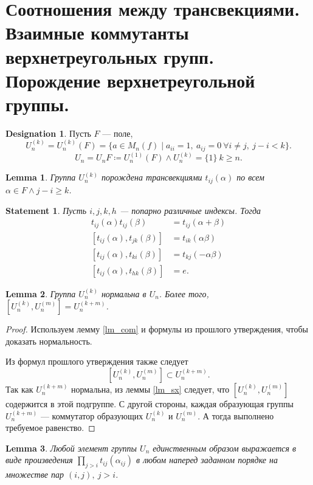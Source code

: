 \documentclass[11pt]{book}
\renewcommand{\ge}{\geqslant}
\theoremstyle{definition}
\theoremstyle{plain}
\theoremstyle{plain}
\newtheorem{lm}{Lemma}
\newtheorem{st}{Statement}
\theoremstyle{definition}
\newtheorem*{name}{Designation}
\theoremstyle{remark}
\begin{document}
\section{Соотношения между трансвекциями. Взаимные коммутанты верхнетреугольных групп. Порождение верхнетреугольной группы.}
\begin{name}
    Пусть $ F$ --- поле,
    \[
	U_n^{(k)} = U_{n}^{(k)}(F)=\{a \in M_{n}(f) \mid a_{ii} = 1, ~ a_{ij} = 0 ~ \forall i \ne j , ~ j - i < k\}
    .\]
    \[
	U_n = U_{n}F \coloneqq U_{n}^{(1)}(F) \wedge U_n^{(k)} = \{1\} ~ k \ge  n
    .\]
\end{name}
\begin{lm}
    Группа $ U_{n}^{(k)}$ порождена трансвекциями $ t_{ij}(\alpha) $ по всем $ \alpha \in F \wedge  j - i \ge k$.
\end{lm}
\begin{st}
    Пусть $ i, j, k, h$ --- попарно различные индексы. Тогда
    \begin{align*}
	t_{ij}(\alpha)t_{ij}(\beta) &= t_{ij}(\alpha+\beta)\\
	[t_{ij}(\alpha), t_{jk}(\beta)] &= t_{ik}(\alpha\beta) \\
	[t_{ij}(\alpha), t_{ki}(\beta)] &= t_{kj}(-\alpha\beta) \\
	[t_{ij}(\alpha), t_{hk}(\beta)] &= e.
    \end{align*}
\end{st}
\begin{lm}\label{lm_u_n}
    Группа $ U_{n}^{(k)}$ нормальна в $ U_n$. Более того,  $ [U_{n}^{(k)}, U_{n}^{(m)}] = U_{n}^{(k+m)}$.
\end{lm}
\begin{proof}
    Используем лемму \ref{lm_com} и формулы из прошлого утверждения, чтобы доказать нормальность.

    Из формул прошлого утверждения также следует
    \[
	[U_{n}^{(k)}, U_{n}^{(m)}] \subset  U_{n}^{(k+m)}
    .\]
    Так как $ U_{n}^{(k+m)}$ нормальна, из леммы \ref{lm_sx} следует, что $ [U_{n}^{(k)}, U_{n}^{(m)}]$ содержится в этой подгруппе. С другой стороны, каждая образующая группы $ U_n^{(k+m)}$ --- коммутатор образующих $ U_{n}^{(k)}$ и $ U_{n}^{(m)}$. А тогда выполнено требуемое равенство.
\end{proof}
\begin{lm}\label{lm_all}
    Любой элемент группы $ U_n$ единственным образом выражается в виде произведения  $ \prod_{j>i}t_{ij}(\alpha_{ij})$ в любом наперед заданном порядке на множестве пар $ (i, j), ~ j> i$.
\end{lm}
\end{document}
